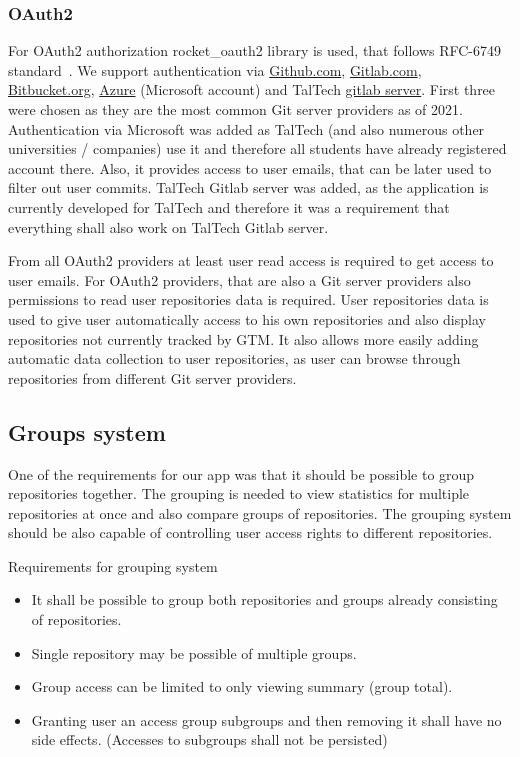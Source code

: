 \subsubsection{OAuth2}\label{subsubsec:oauth2}
For OAuth2 authorization rocket{\_}oauth2 library is used, that follows RFC-6749 standard~\cite{rocket-oauth2, oauth2}.
We support authentication via \href{https://github.com/}{Github.com}, \href{https://about.gitlab.com/}{Gitlab.com},
\href{https://bitbucket.org/}{Bitbucket.org}, \href{https://azure.microsoft.com/}{Azure} (Microsoft account) and
TalTech \href{https://gitlab.cs.ttu.ee/}{gitlab server}.
First three were chosen as they are the most common Git server providers as of 2021.
Authentication via Microsoft was added as TalTech (and also numerous other universities / companies) use it and therefore
all students have already registered account there.
Also, it provides access to user emails, that can be later used to filter out user commits.
TalTech Gitlab server was added, as the application is currently developed for TalTech and therefore it was a requirement
that everything shall also work on TalTech Gitlab server.

From all OAuth2 providers at least user read access is required to get access to user emails.
For OAuth2 providers, that are also a Git server providers also permissions to read user repositories data is required.
User repositories data is used to give user automatically access to his own repositories and also display repositories
not currently tracked by GTM.
It also allows more easily adding automatic data collection to user repositories, as user can browse through
repositories from different Git server providers.

\subsection{Groups system}\label{subsec:group-system}
One of the requirements for our app was that it should be possible to group repositories together.
The grouping is needed to view statistics for multiple repositories at once and also compare groups of repositories.
The grouping system should be also capable of controlling user access rights to different repositories.

Requirements for grouping system
\begin{itemize}
    \item It shall be possible to group both repositories and groups already consisting of repositories.
    \item Single repository may be possible of multiple groups.
    \item Group access can be limited to only viewing summary (group total).
    \item Granting user an access group subgroups and then removing it shall have no side effects. (Accesses to subgroups shall not be persisted)
\end{itemize}

